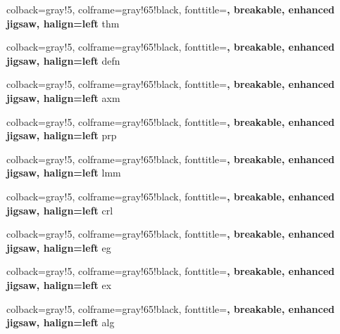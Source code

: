


%
{	colback=gray!5, 
	colframe=gray!65!black, 
	fonttitle=\bfseries, 
	breakable, 
	enhanced jigsaw, 
	halign=left
}{thm}

%
{	colback=gray!5, 
	colframe=gray!65!black, 
	fonttitle=\bfseries, breakable, 
	enhanced jigsaw, 
	halign=left
}{defn}

%
{	colback=gray!5, 
	colframe=gray!65!black, 
	fonttitle=\bfseries, 
	breakable, 
	enhanced jigsaw, 
	halign=left
}{axm}

%
{	colback=gray!5, 
	colframe=gray!65!black, 
	fonttitle=\bfseries, 
	breakable, 
	enhanced jigsaw, 
	halign=left
}{prp}

%
{	colback=gray!5, 
	colframe=gray!65!black, 
	fonttitle=\bfseries, 
	breakable, 
	enhanced jigsaw, 
	halign=left
}{lmm}

%
{	colback=gray!5, 
	colframe=gray!65!black, 
	fonttitle=\bfseries, 
	breakable, 
	enhanced jigsaw, 
	halign=left
}{crl}

%
{	colback=gray!5, 
	colframe=gray!65!black, 
	fonttitle=\bfseries, 
	breakable, 
	enhanced jigsaw, 
	halign=left
}{eg}

%
{	colback=gray!5, 
	colframe=gray!65!black, 
	fonttitle=\bfseries, 
	breakable, 
	enhanced jigsaw, 
	halign=left
}{ex}

%
{	colback=gray!5, 
	colframe=gray!65!black, 
	fonttitle=\bfseries, 
	breakable, 
	enhanced jigsaw, 
	halign=left
}{alg}




\hypersetup{
    colorlinks=true, %
    linktoc=all,     %
    linkcolor=DarkBlue,  %
    citecolor=blue,  %
}
